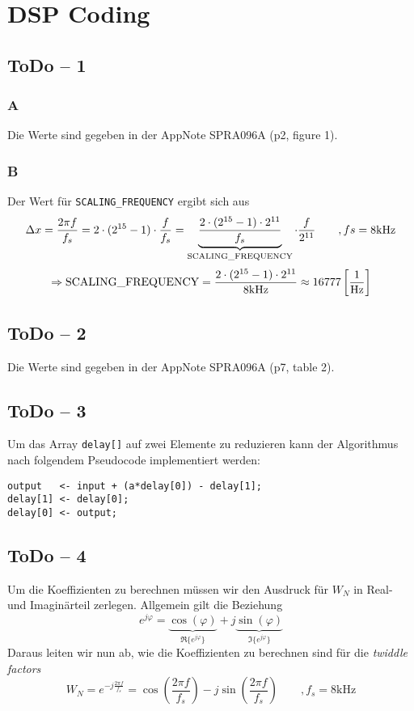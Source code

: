 \section{DSP Coding}

\subsection{ToDo -- 1}

\subsubsection{A}
Die Werte sind gegeben in der AppNote SPRA096A (p2, figure 1).

\subsubsection{B}
Der Wert für \lstinline{SCALING_FREQUENCY} ergibt sich aus
\[
	\Delta x = \frac{2 \pi f}{f_s} \\
	= 2 \cdot (2^{15} - 1 ) \cdot \frac{f}{f_s} \\
	= \underbrace{\frac{2 \cdot (2^{15} -1 )
		\cdot 2^{11}}{f_s}}_{\text{\lstinline{SCALING_FREQUENCY}}}
		\cdot \frac{f}{2^{11}} \qquad ,fs = 8\text{kHz}
\]
\[
	\Rightarrow \text{\lstinline{SCALING_FREQUENCY}} = 
	\frac{2 \cdot (2^{15} -1 ) \cdot 2^{11}}{8\text{kHz}}
		\approx 16777 \left[ \frac{1}{\text{Hz}} \right]
\]

\subsection{ToDo -- 2}
Die Werte sind gegeben in der AppNote SPRA096A (p7, table 2).

\subsection{ToDo -- 3}
Um das Array \lstinline{delay[]} auf zwei Elemente zu reduzieren kann der
Algorithmus nach folgendem Pseudocode implementiert werden:

\begin{lstlisting}
output   <- input + (a*delay[0]) - delay[1];
delay[1] <- delay[0];
delay[0] <- output;
\end{lstlisting}

\subsection{ToDo -- 4}
Um die Koeffizienten zu berechnen müssen wir den Ausdruck für $W_N$ in
Real- und Imaginärteil zerlegen. Allgemein gilt die Beziehung
\[
	e^{j\varphi} =
		\underbrace{\cos(\varphi)}_{\Re\{e^{j\varphi}\}}
		+ j \underbrace{\sin(\varphi)}_{\Im\{e^{j\varphi}\}}
\]
Daraus leiten wir nun ab, wie die Koeffizienten zu berechnen sind für die
\emph{twiddle factors}
\[
	W_N
	= e^{-j\frac{2 \pi f}{f_s}}
	= \cos\left(\frac{2 \pi f}{f_s}\right)
		- j\sin\left(\frac{2 \pi f}{f_s}\right)
	\qquad , f_s = 8 \text{kHz}
\]

